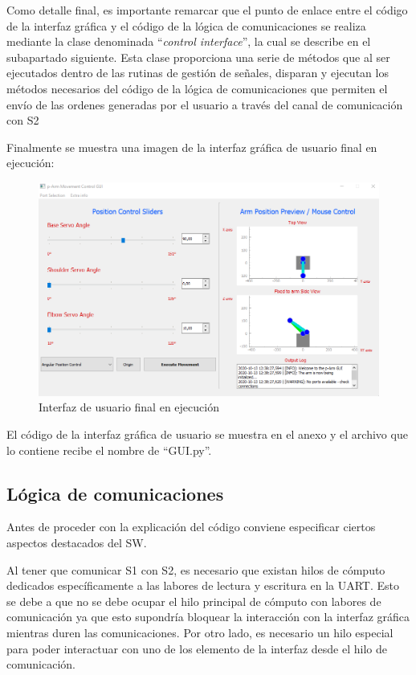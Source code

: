 Como detalle final, es importante remarcar que el punto de enlace entre el código de la interfaz gráfica y el código de la lógica de comunicaciones se realiza mediante la clase denominada  ``\textit{control interface}'', la cual se describe en el subapartado siguiente. Esta clase proporciona una serie de métodos que al ser ejecutados dentro de las rutinas de gestión de señales, disparan y ejecutan los métodos necesarios del código de la lógica de comunicaciones que permiten el envío de las ordenes generadas por el usuario a través del canal de comunicación con \ac{S2}

Finalmente se muestra una imagen de la interfaz gráfica de usuario final en ejecución:
\begin{figure}[H]
    \centering
    \includegraphics[width=0.85\linewidth]{pictures/Gui_Final.png}
    \caption{Interfaz de usuario final en ejecución}
    \label{fig:ui_finalexe}
\end{figure}

El código de la interfaz gráfica de usuario se muestra en el anexo y el archivo que lo contiene recibe el nombre de ``GUI.py''.


\subsection{Lógica de comunicaciones}
Antes de proceder con la explicación del código conviene especificar ciertos aspectos destacados del \ac{SW}.

Al tener que comunicar \ac{S1} con \ac{S2}, es necesario que existan hilos de cómputo dedicados específicamente a las labores de lectura y escritura en la UART. Esto se debe a que no se debe ocupar el hilo principal de cómputo con labores de comunicación ya que esto supondría bloquear la interacción con la interfaz gráfica mientras duren las comunicaciones.
Por otro lado, es necesario un hilo especial para poder interactuar con uno de los elemento de la interfaz desde el hilo de comunicación.

